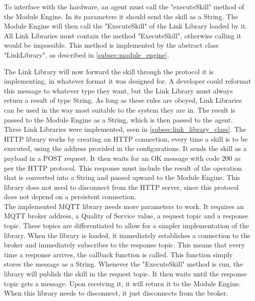 To interface with the hardware, an agent must call the "executeSkill" method of the Module Engine. In its parameters it should send the skill as a String. The Module Engine will then call the "ExecuteSkill" of the Link Library loaded by it. All Link Libraries must contain the method "ExecuteSkill", otherwise calling it would be impossible. This method is implemented by the abstract class "LinkLibrary", as described in \ref{subsec:module_engine}.

The Link Library will now forward the skill through the protocol it is implementing, in whatever format it was designed for. A developer could reformat this message to whatever type they want, but the Link Library must always return a result of type String. As long as these rules are obeyed, Link Libraries can be used in the way most suitable to the system they are in. The result is passed to the Module Engine as a String, which is then passed to the agent.\\

Three Link Libraries were implemented, seen in \ref{subsec:link_library_class}. The \acrshort{HTTP} library works by creating an \acrshort{HTTP} connection, every time a skill is to be executed, using the address provided in the configurations. It sends the skill as a payload in a POST request. It then waits for an OK message with code 200 as per the \acrshort{HTTP} protocol. This response must include the result of the operation that is converted into a String and passed upward to the Module Engine. This library does not need to disconnect from the \acrshort{HTTP} server, since this protocol does not depend on a persistent connection.\\

The implemented \acrshort{MQTT} library needs more parameters to work. It requires an \acrshort{MQTT} broker address, a \acrfull{Quality of Service} value, a request topic and a response topic. These topics are differentiated to allow for a simpler implementation of the library. When the library is loaded, it immediately establishes a connection to the broker and immediately subscribes to the response topic. This means that every time a response arrives, the callback function is called. This function simply stores the message as a String. Whenever the "ExecuteSkill" method is run, the library will publish the skill in the request topic. It then waits until the response topic gets a message. Upon receiving it, it will return it to the Module Engine. When this library needs to disconnect, it just disconnects from the broker.\\

